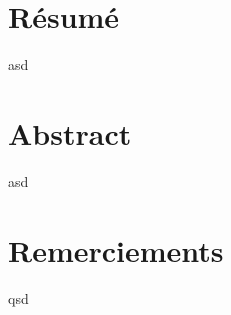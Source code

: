 \chapter*{Résumé}
asd
\newpage

\chapter*{Abstract}
asd
\newpage

\chapter*{Remerciements}
qsd
\newpage